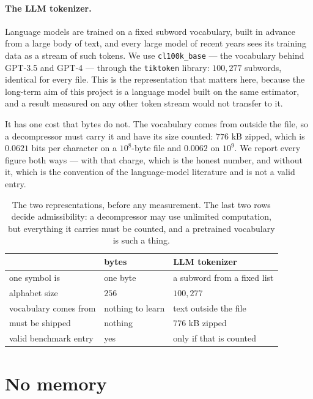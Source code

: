 \documentclass[11pt]{article}
\begin{document}
\paragraph{The LLM tokenizer.}  Language models are trained on a fixed
subword vocabulary, built in advance from a large body of text, and
every large model of recent years sees its training data as a stream of
such tokens.  We use \texttt{cl100k\_base} --- the vocabulary behind
GPT-3.5 and GPT-4 --- through the \texttt{tiktoken} library:
$100{,}277$ subwords, identical for every file.  This is the
representation that matters here, because the long-term aim of this
project is a language model built on the same estimator, and a result
measured on any other token stream would not transfer to it.

It has one cost that bytes do not.  The vocabulary comes from outside
the file, so a decompressor must carry it and have its size counted:
$776$ kB zipped, which is $0.0621$ bits per character on a $10^8$-byte
file and $0.0062$ on $10^9$.  We report every figure both ways --- with
that charge, which is the honest number, and without it, which is the
convention of the language-model literature and is not a valid entry.

\begin{table}[ht]
\centering
\begin{tabular}{lll}
\toprule
 & bytes & LLM tokenizer \\
\midrule
one symbol is         & one byte          & a subword from a fixed list \\
alphabet size         & $256$             & $100{,}277$ \\
vocabulary comes from & nothing to learn  & text outside the file \\
must be shipped       & nothing           & $776$ kB zipped \\
valid benchmark entry & yes               & only if that is counted \\
\bottomrule
\end{tabular}
\caption{The two representations, before any measurement.  The last two
  rows decide admissibility: a decompressor may use unlimited
  computation, but everything it carries must be counted, and a
  pretrained vocabulary is such a thing.}
\label{tab:representations}
\end{table}

\section{No memory}
\label{sec:text8}
\end{document}
